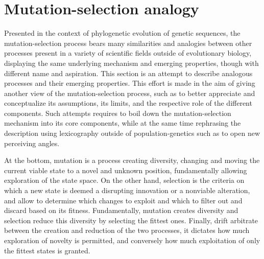 \begin{table}[H]
    \centering
    \noindent{}
    \caption[Parameters of mutation-selection processes]{Parameter of mutation-selection processes}
    \label{table:params-mutsel}
\end{table}


\section{Mutation-selection analogy}
Presented in the context of phylogenetic evolution of genetic sequences, the mutation-selection process bears many similarities and analogies between other processes present in a variety of scientific fields outside of evolutionary biology, displaying the same underlying mechanism and emerging properties, though with different name and aspiration.
This section is an attempt to describe analogous processes and their emerging properties.
This effort is made in the aim of giving another view of the mutation-selection process, such as to better appreciate and conceptualize its assumptions, its limits, and the respective role of the different components.
Such attempts requires to boil down the mutation-selection mechanism into its core components, while at the same time rephrasing the description using lexicography outside of population-genetics such as to open new perceiving angles.

At the bottom, mutation is a process creating diversity, changing and moving the current viable state to a novel and unknown position, fundamentally allowing exploration of the state space.
On the other hand, selection is the criteria on which a new state is deemed a disrupting innovation or a nonviable alteration, and allow to determine which changes to exploit and which to filter out and discard based on its fitness.
Fundamentally, mutation creates diversity and selection reduce this diversity by selecting the fittest ones.
Finally, drift arbitrate between the creation and reduction of the two processes, it dictates how much exploration of novelty is permitted, and conversely how much exploitation of only the fittest states is granted.

